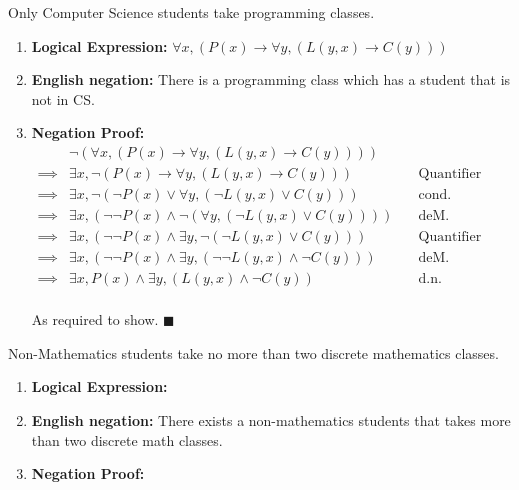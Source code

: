 \documentclass[]{article}
\begin{document}
\vspace{0.1in}
\begin{question}{2.2}
Only Computer Science students take programming classes.
\end{question}
\begin{enumerate}[label=(\alph*)]
    \item \textbf{Logical Expression:} $\forall x, (P(x) \rightarrow \forall y, (L(y, x) \rightarrow C(y)))$
    \item \textbf{English negation:} There is a programming class which has a student that is not in CS.
    \item \textbf{Negation Proof:}
    \begin{align*}
        &\neg(\forall x, (P(x) \rightarrow \forall y, (L(y, x) \rightarrow C(y))))\quad & \\
        \implies&\exists x, \neg(P(x) \rightarrow \forall y, (L(y, x) \rightarrow C(y))) \quad & \text{Quantifier Negation} \\
        \implies&\exists x, \neg(\neg P(x) \lor \forall y, (\neg L(y, x) \lor C(y))) \quad & \text{cond.} \\
        \implies&\exists x, (\neg\neg P(x) \land \neg (\forall y, (\neg L(y, x) \lor C(y)))) \quad & \text{deM.} \\
        \implies&\exists x, (\neg\neg P(x) \land \exists y, \neg(\neg L(y, x) \lor C(y))) \quad & \text{Quantifier Negation} \\
        \implies&\exists x, (\neg\neg P(x) \land \exists y, (\neg\neg L(y, x) \land \neg C(y))) \quad & \text{deM.} \\
        \implies&\exists x, P(x) \land \exists y, (L(y, x) \land \neg C(y)) \quad & \text{d.n.} \\
    \end{align*}
    \begin{center}
        As required to show. $\blacksquare$
    \end{center}
\end{enumerate}

\begin{question}{2.3}
Non-Mathematics students take no more than two discrete mathematics classes.
\end{question}
\begin{enumerate}[label=(\alph*)]
    \item \textbf{Logical Expression:}
    \item \textbf{English negation:} There exists a non-mathematics students that takes more than two discrete math classes.
    \item \textbf{Negation Proof:}
\end{enumerate}
\end{document}
